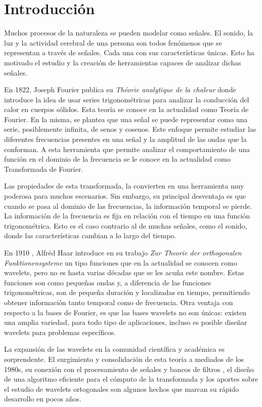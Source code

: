 \chapter*{Introducción}\label{chapter:introduction}

Muchos procesos de la naturaleza se pueden modelar como señales. El sonido, la luz y la actividad
cerebral de una persona son todos fenómenos que se representan a través de señales. Cada una con
sus características únicas. Esto ha motivado el estudio y la creación de herramientas capaces
de analizar dichas señales. 

En 1822, Joseph Fourier publica su \textit{ Théorie analytique de la chaleur } \cite{Fourier2009} donde introduce la idea de usar
series trigonométricas para analizar la conducción del calor en cuerpos sólidos. Esta teoría se conoce en
la actualidad como Teoría de Fourier. En la misma, se plantea que una señal se puede representar como
una serie, posiblemente infinita, de senos y cosenos. Este enfoque permite estudiar las diferentes 
frecuencias presentes en una señal y la amplitud de las ondas que la conforman. A esta herramienta que permite
analizar el comportamiento de una función en el dominio de la frecuencia se le conoce en la actualidad como
Transformada de Fourier.

Las propiedades de esta transformada, la convierten en una herramienta muy poderosa para muchos escenarios. 
Sin embargo, su principal desventaja es que cuando se pasa al dominio de las frecuencias, la información 
temporal se pierde. La información de la frecuencia es fija en relación con el tiempo en una función 
trigonométrica. Esto es el caso contrario al de muchas señales, como el sonido, donde las características
cambian a lo largo del tiempo. 

En 1910 , Alfréd Haar introduce en su trabajo \textit{Zur Theorie der orthogonalen Funktionensysteme} \cite{Haar1910} un tipo 
funciones que en la actualidad se conocen como wavelets, pero no es
hasta varias décadas que se les acuña este nombre. Estas funciones son como pequeñas ondas y, a diferencia
de las funciones trigonométricas, son de pequeña duración y localizadas en tiempo, permitiendo obtener información tanto temporal como
de frecuencia. Otra ventaja con respecto a la bases de Fourier, es que las bases wavelets no son únicas: 
existen una amplia variedad, para todo tipo de aplicaciones, incluso es posible diseñar wavelets para problemas
específicos.

La expansión de las wavelets en la comunidad científica y académica es sorprendente.
El surgimiento y consolidación de esta teoría a mediados de los 1980s, su conexión con el procesamiento
de señales y bancos de filtros \cite{Mallat2008}, el diseño de una algoritmo eficiente para el cómputo de la transformada \cite{Mallat2008}
y los aportes sobre el estudio de wavelets ortogonales \cite{daubechies1992} son algunos hechos que marcan su rápido desarrollo en
pocos años.   

